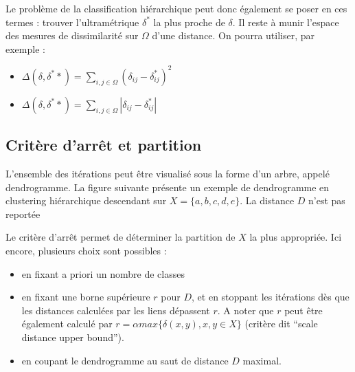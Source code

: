 \documentclass[letterpaper,10pt,english]{jupyterBook}
\begin{document}
\sphinxAtStartPar
Le problème de la classification hiérarchique peut donc également se poser en ces termes : trouver l’ultramétrique \(\delta^*\) la plus proche de \(\delta\). Il reste à munir l’espace des mesures de dissimilarité sur  \(\Omega\) d’une distance. On pourra utiliser, par exemple :
\begin{itemize}
\item {} 
\sphinxAtStartPar
\(\Delta(\delta,\delta^**)=\displaystyle\sum_{i,j\in \Omega}(\delta_{ij}-\delta^*_{ij})^2\)

\item {} 
\sphinxAtStartPar
\(\Delta(\delta,\delta^**)=\displaystyle\sum_{i,j\in \Omega}|\delta_{ij}-\delta^*_{ij}|\)

\end{itemize}


\subsection{Critère d’arrêt et partition}
\label{\detokenize{clustering:critere-d-arret-et-partition}}
\ignorespaces 
\sphinxAtStartPar
L’ensemble des itérations peut être visualisé sous la forme d’un arbre, appelé dendrogramme. La figure suivante présente un exemple de dendrogramme en clustering hiérarchique descendant sur \(X = \{a, b, c, d, e\}\). La distance \(D\) n’est pas reportée

\sphinxAtStartPar
{}

\sphinxAtStartPar
Le critère d’arrêt permet de déterminer la partition  de \(X\) la plus appropriée. Ici encore, plusieurs choix sont possibles :
\begin{itemize}
\item {} 
\sphinxAtStartPar
en fixant a priori un nombre de classes

\item {} 
\sphinxAtStartPar
en fixant une borne supérieure \(r\) pour \(D\), et en stoppant les itérations dès que les distances calculées par les liens dépassent \(r\). A noter que \(r\) peut être également calculé par \(r=\alpha max\{\delta(x,y),x,y\in X\}\) (critère dit “scale distance upper bound”).

\item {} 
\sphinxAtStartPar
en coupant le dendrogramme au saut de distance \(D\) maximal.

\end{itemize}

\sphinxAtStartPar
{}
\end{document}

